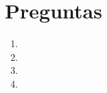\documentclass[11pt]{article}
\begin{document}


\section*{Preguntas}

\begin{enumerate}
    \item 
    \item 
    \item 
    \item 
\end{enumerate}
\end{document}
